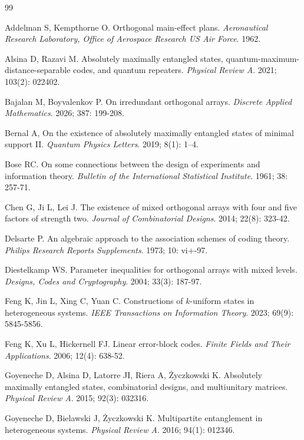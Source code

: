 \documentclass[11pt]{article}
\newtheorem{Definition and Notation}[Theorem]{Definition and Notation}
\begin{document}
\begin{thebibliography}{99}

 Addelman S, Kempthorne O. Orthogonal main-effect plans. {\it Aeronautical Research Laboratory, Office of Aerospace Research US Air Force}. 1962.

 Alsina D, Razavi M. Absolutely maximally entangled states, quantum-maximum-distance-separable codes, and quantum repeaters. {\it Physical Review A}. 2021; 103(2): 022402.

 Bajalan M, Boyvalenkov P. On irredundant orthogonal arrays. {\it Discrete Applied Mathematics}. 2026; 387: 199-208.

 Bernal A, On the existence of absolutely maximally entangled states of minimal support II. {\it Quantum Physics Letters}. 2019; 8(1): 1–4.

 Bose RC. On some connections between the design of experiments and information theory. {\it Bulletin of the International Statistical Institute}. 1961; 38: 257-71.

 Chen G, Ji L, Lei J. The existence of mixed orthogonal arrays with four and five factors of strength two. {\it Journal of Combinatorial Designs}. 2014; 22(8): 323-42.

 Delsarte P. An algebraic approach to the association schemes of coding theory. {\it Philips Research Reports Supplements}. 1973; 10: vi+-97.

 Diestelkamp WS. Parameter inequalities for orthogonal arrays with mixed levels. {\it Designs, Codes and Cryptography}. 2004; 33(3): 187-97.

 Feng K, Jin L, Xing C, Yuan C. Constructions of $k$-uniform states in heterogeneous systems. {\it IEEE Transactions on Information Theory}. 2023; 69(9): 5845-5856.

 Feng K, Xu L, Hickernell FJ. Linear error-block codes. {\it Finite Fields and Their Applications}. 2006; 12(4): 638-52.

 Goyeneche D, Alsina D, Latorre JI, Riera A, \.{Z}yczkowski K. Absolutely maximally entangled states, combinatorial designs, and multiunitary matrices. {\it Physical Review A}. 2015; 92(3): 032316.

 Goyeneche D, Bielawski J, \.{Z}yczkowski K. Multipartite entanglement in heterogeneous systems. {\it Physical Review A}. 2016; 94(1): 012346.


\end{thebibliography}
\end{document}
